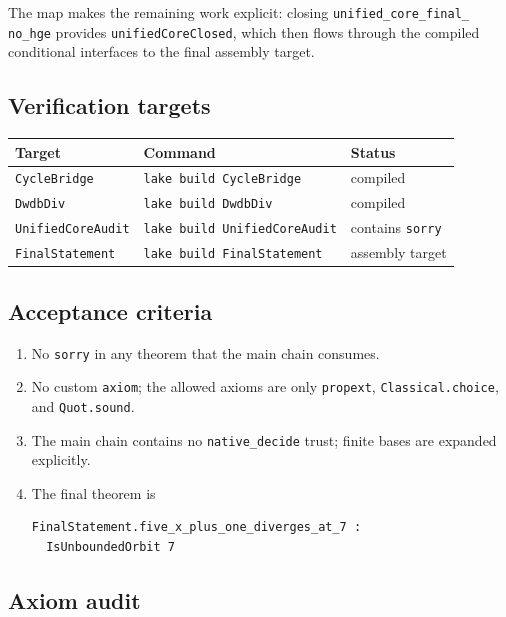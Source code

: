 The map makes the remaining work explicit: closing
\texttt{unified\_\allowbreak core\_\allowbreak final\_\allowbreak
no\_\allowbreak hge} provides \texttt{unifiedCoreClosed}, which then
flows through the compiled conditional interfaces to the final
assembly target.

\subsection{Verification targets}

\begin{center}
\small
\begin{tabular}{@{}p{}p{}p{}@{}}
\toprule
Target & Command & Status \\
\midrule
\texttt{CycleBridge} & \texttt{lake build CycleBridge} & compiled \\
\texttt{DwdbDiv} & \texttt{lake build DwdbDiv} & compiled \\
\texttt{UnifiedCoreAudit} & \texttt{lake build UnifiedCoreAudit} &
contains \texttt{sorry} \\
\texttt{FinalStatement} & \texttt{lake build FinalStatement} &
assembly target \\
\bottomrule
\end{tabular}
\end{center}

\subsection{Acceptance criteria}

\begin{enumerate}[leftmargin=*]
\item No \texttt{sorry} in any theorem that the main chain consumes.
\item No custom \texttt{axiom}; the allowed axioms are only
  \texttt{propext}, \texttt{Classical.choice}, and \texttt{Quot.sound}.
\item The main chain contains no \texttt{native\_decide} trust; finite bases
  are expanded explicitly.
\item The final theorem is
  \begin{verbatim}
FinalStatement.five_x_plus_one_diverges_at_7 :
  IsUnboundedOrbit 7
  \end{verbatim}
\end{enumerate}

\subsection{Axiom audit}

